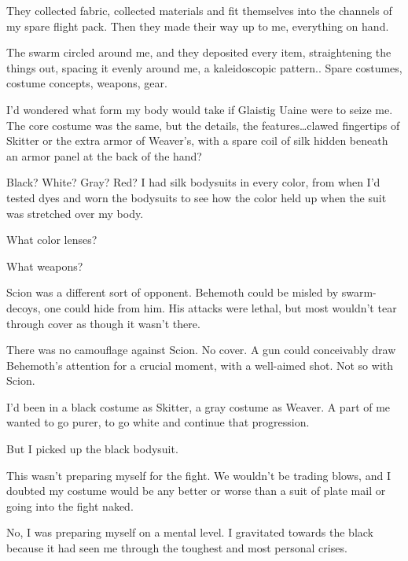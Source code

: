 They collected fabric, collected materials and fit themselves into the channels of my spare flight pack.  Then they made their way up to me, everything on hand.



The swarm circled around me, and they deposited every item, straightening the things out, spacing it evenly around me, a kaleidoscopic pattern..  Spare costumes, costume concepts, weapons, gear.



I'd wondered what form my body would take if Glaistig Uaine were to seize me.  The core costume was the same, but the details, the features\ldots clawed fingertips of Skitter or the extra armor of Weaver's, with a spare coil of silk hidden beneath an armor panel at the back of the hand?



Black?  White?  Gray?  Red?  I had silk bodysuits in every color, from when I'd tested dyes and worn the bodysuits to see how the color held up when the suit was stretched over my body.



What color lenses?



What weapons?



Scion was a different sort of opponent.  Behemoth could be misled by swarm-decoys, one could hide from him.  His attacks were lethal, but most wouldn't tear through cover as though it wasn't there.



There was no camouflage against Scion.  No cover.  A gun could conceivably draw Behemoth's attention for a crucial moment, with a well-aimed shot.  Not so with Scion.



I'd been in a black costume as Skitter, a gray costume as Weaver.  A part of me wanted to go purer, to go white and continue that progression.



But I picked up the black bodysuit.



This wasn't preparing myself for the fight.  We wouldn't be trading blows, and I doubted my costume would be any better or worse than a suit of plate mail or going into the fight naked.



No, I was preparing myself on a mental level.  I gravitated towards the black because it had seen me through the toughest and most personal crises.



